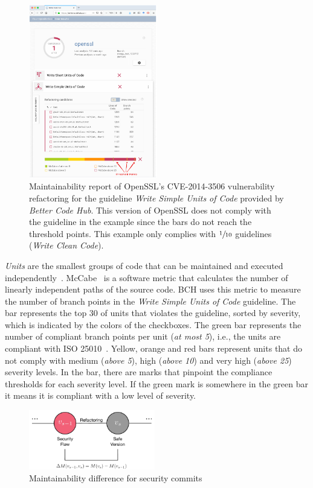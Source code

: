 \documentclass[10pt,conference]{IEEEtran}
\begin{document}
\begin{figure}[h]
 	\centering 	\includegraphics[width=0.5\textwidth]{figures/bch_report.png}
 	\caption{Maintainability report of OpenSSL's CVE-2014-3506 vulnerability
refactoring for the guideline \emph{Write Simple Units of Code} provided by
\emph{Better Code Hub}. This version of OpenSSL does not comply with the
guideline in the example since the bars do not reach the threshold points. This
example only complies with $\sfrac{1}{10}$ guidelines (\emph{Write Clean Code}).}
	\label{fig:bchrep}
\end{figure}

\emph{Units} are the smallest groups of code that can be maintained and executed
independently~\cite{Visser:2016:OREILLY}. McCabe~\cite{1702388} is a software
metric that calculates the number of linearly independent paths of the source
code. BCH uses this metric to measure the number of branch points in the
\emph{Write Simple Units of Code} guideline. The bar represents the top 30 of
units that violates the guideline, sorted by severity, which is indicated by the
colors of the checkboxes. The green bar represents the number of compliant
branch points per unit (\emph{at most 5}), i.e., the units are compliant with
ISO 25010~\cite{iso:2011}. Yellow, orange and red bars represent units that do
not comply with medium (\emph{above 5}), high (\emph{above 10}) and very high
(\emph{above 25}) severity levels. In the bar, there are marks that pinpoint the
compliance thresholds for each severity level. If the green mark is somewhere
in the green bar it means it is compliant with a low level of severity.

\begin{figure}[h]
 	\centering 	\includegraphics[width=0.49\textwidth]{figures/commit.pdf}
 	\caption{Maintainability difference for security commits}
	\label{fig:commit}
\end{figure}
\end{document}

